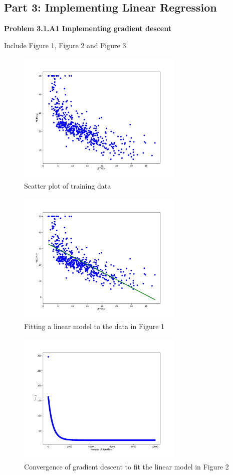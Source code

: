 \documentclass[]{book}
\theoremstyle{definition}
\begin{document}
\subsection*{Part 3: Implementing Linear Regression}
\vspace{4mm}
\textbf{Problem 3.1.A1 Implementing gradient descent}
\begin{flushleft}
	Include Figure 1, Figure 2 and Figure 3
\end{flushleft}
\begin{figure}[h]
	\centering
	\includegraphics[width=8cm]{fig1.pdf}
	\caption{Scatter plot of training data}
	\label{fig:1}
\end{figure}
\begin{figure}[h]
	\centering 
	\includegraphics[width=8cm]{fig2a.pdf}
	\caption{Fitting a linear model to the data in Figure 1}
	\label{fig:2}
\end{figure}
\begin{figure}[H]
	\centering
	\includegraphics[width=8cm]{fig2b.pdf}
	\caption{Convergence of gradient descent to fit the linear model in Figure 2}
	\label{fig:3}
\end{figure}
\end{document}

